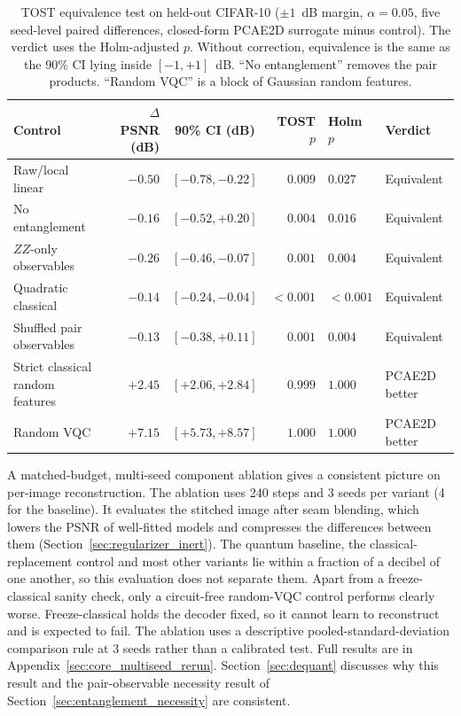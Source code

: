 \documentclass[pdflatex,sn-basic]{sn-jnl}
\begin{document}
\begin{table}[t]
  \centering
  \caption[TOST equivalence test on held-out CIFAR-10]{TOST equivalence test on held-out CIFAR-10 ($\pm1$~dB margin, $\alpha=0.05$, five seed-level paired differences, closed-form PCAE2D surrogate minus control).
  The verdict uses the Holm-adjusted $p$.
  Without correction, equivalence is the same as the 90\% CI lying inside $[-1,+1]$~dB.
  ``No entanglement'' removes the pair products.
  ``Random VQC'' is a block of Gaussian random features.}
  \label{tab:tost_main}
  \footnotesize
  \setlength{\tabcolsep}{2pt}
  \begin{tabular}{@{}l r c r l l@{}}
    \toprule
    Control                          & $\Delta$PSNR (dB) & 90\% CI (dB)       & TOST $p$  & Holm $p$ & Verdict \\
    \midrule
    Raw/local linear                 & $-0.50$ & $[-0.78,-0.22]$ & $0.009$   & $0.027$ & Equivalent \\
    No entanglement                  & $-0.16$ & $[-0.52,+0.20]$ & $0.004$   & $0.016$ & Equivalent \\
    $ZZ$-only observables            & $-0.26$ & $[-0.46,-0.07]$ & $0.001$   & $0.004$ & Equivalent \\
    Quadratic classical              & $-0.14$ & $[-0.24,-0.04]$ & $<0.001$   & $<0.001$ & Equivalent \\
    Shuffled pair observables        & $-0.13$ & $[-0.38,+0.11]$ & $0.001$  & $0.004$ & Equivalent \\
    Strict classical random features & $+2.45$ & $[+2.06,+2.84]$ & $0.999$   & $1.000$ & PCAE2D better \\
    Random VQC                       & $+7.15$ & $[+5.73,+8.57]$ & $1.000$   & $1.000$ & PCAE2D better \\
    \bottomrule
  \end{tabular}
\end{table}

A matched-budget, multi-seed component ablation gives a consistent picture on per-image reconstruction.
The ablation uses 240 steps and 3 seeds per variant (4 for the baseline).
It evaluates the stitched image after seam blending, which lowers the PSNR of well-fitted models and compresses the differences between them (Section~\ref{sec:regularizer_inert}).
The quantum baseline, the classical-replacement control and most other variants lie within a fraction of a decibel of one another, so this evaluation does not separate them.
Apart from a freeze-classical sanity check, only a circuit-free random-VQC control performs clearly worse.
Freeze-classical holds the decoder fixed, so it cannot learn to reconstruct and is expected to fail.
The ablation uses a descriptive pooled-standard-deviation comparison rule at 3 seeds rather than a calibrated test.
Full results are in Appendix~\ref{sec:core_multiseed_rerun}.
Section~\ref{sec:dequant} discusses why this result and the pair-observable necessity result of Section~\ref{sec:entanglement_necessity} are consistent.
\end{document}
